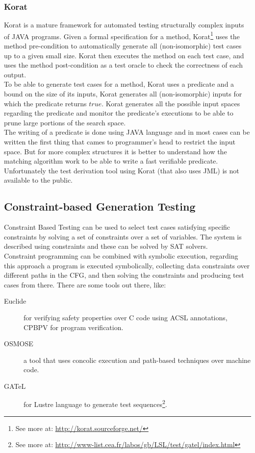 \subsubsection{Korat}
Korat\cite{Boyapati02korat:automated} is a mature framework for automated testing structurally complex inputs of JAVA programs.
Given a formal specification for a method, Korat\footnote{See more at: \url{http://korat.sourceforge.net/}} uses the method pre-condition
to automatically generate all (non-isomorphic) test cases up to a given small size.
Korat then executes the method on each test case, and uses the method post-condition as a test oracle to check the correctness of each output.\\
To be able to generate test cases for a method, Korat uses a predicate and a bound on the size of its inputs,
Korat generates all (non-isomorphic) inputs for which the predicate returns $true$.
Korat generates all the possible input spaces regarding the predicate and monitor the predicate's executions to be able to prune large portions of the search space.\\
\indent The writing of a predicate is done using JAVA language and in most cases can be written the first thing that cames to programmer's head to restrict the input space.
But for more complex structures it is better to understand how the matching algorithm work to be able to write a fast verifiable predicate.\\
Unfortunately the test derivation tool using Korat (that also uses JML) is not available to the public.

\subsection{Constraint-based Generation Testing}
Constraint Based Testing\cite{DeMillo91constraint-basedautomatic} can be used to select test cases satisfying specific constraints by
solving a set of constraints over a set of variables. The system is described using constraints and these can be solved by SAT solvers.\\
Constraint programming can be combined with symbolic execution, regarding this approach a program is executed symbolically,
collecting data constraints over different paths in the CFG, and then solving the constraints and producing test cases from there.
There are some tools out there, like:

\begin{description}
\item[Euclide] for verifying safety properties over C code using ACSL annotations, CPBPV for program verification.
\item[OSMOSE] a tool that uses concolic execution and path-based techniques over machine code.
\item[GATeL] for Lustre language to generate test sequences\footnote{See more at: \url{http://www-list.cea.fr/labos/gb/LSL/test/gatel/index.html}}.
\end{description}

